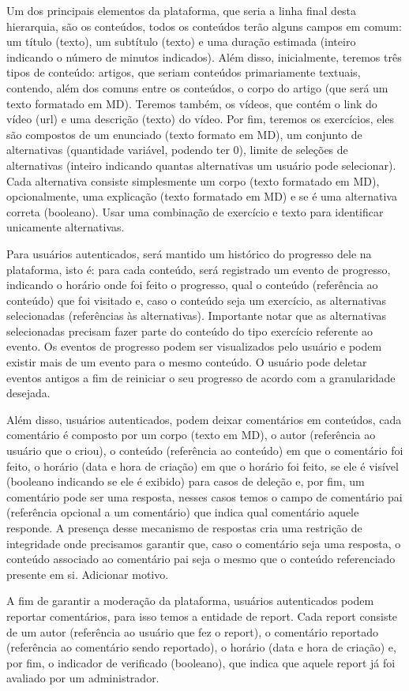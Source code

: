 Um dos principais elementos da plataforma, que seria a linha final desta
hierarquia, são os conteúdos, todos os conteúdos terão alguns campos em comum:
um título (texto), um subtítulo (texto) e uma duração estimada (inteiro
indicando o número de minutos indicados). Além disso, inicialmente, teremos
três tipos de conteúdo: artigos, que seriam conteúdos primariamente textuais,
contendo, além dos comuns entre os conteúdos, o corpo do artigo (que será um
texto formatado em MD). Teremos também, os vídeos, que contém o link do vídeo
(url) e uma descrição (texto) do vídeo. Por fim, teremos os exercícios, eles
são compostos de um enunciado (texto formato em MD), um conjunto de
alternativas (quantidade variável, podendo ter 0), limite de seleções de
alternativas (inteiro indicando quantas alternativas um usuário pode
selecionar). Cada alternativa consiste simplesmente um corpo (texto formatado
em MD), opcionalmente, uma explicação (texto formatado em MD) e se é uma
alternativa correta (booleano). Usar uma combinação de exercício e texto para
identificar unicamente alternativas.

Para usuários autenticados, será mantido um histórico do progresso dele na
plataforma, isto é: para cada conteúdo, será registrado um evento de progresso,
indicando o horário onde foi feito o progresso, qual o conteúdo (referência ao
conteúdo) que foi visitado e, caso o conteúdo seja um exercício, as
alternativas selecionadas (referências às alternativas). Importante notar que
as alternativas selecionadas precisam fazer parte do conteúdo do tipo exercício
referente ao evento. Os eventos de progresso podem ser visualizados pelo
usuário e podem existir mais de um evento para o mesmo conteúdo. O usuário pode
deletar eventos antigos a fim de reiniciar o seu progresso de acordo com a
granularidade desejada.

Além disso, usuários autenticados, podem deixar comentários em conteúdos, cada
comentário é composto por um corpo (texto em MD), o autor (referência ao
usuário que o criou), o conteúdo (referência ao conteúdo) em que o comentário
foi feito, o horário (data e hora de criação) em que o horário foi feito, se
ele é visível (booleano indicando se ele é exibido) para casos de deleção e,
por fim, um comentário pode ser uma resposta, nesses casos temos o campo de
comentário pai (referência opcional a um comentário) que indica qual comentário
aquele responde. A presença desse mecanismo de respostas cria uma restrição de
integridade onde precisamos garantir que, caso o comentário seja uma resposta,
o conteúdo associado ao comentário pai seja o mesmo que o conteúdo referenciado
presente em si. Adicionar motivo.

A fim de garantir a moderação da plataforma, usuários autenticados podem
reportar comentários, para isso temos a entidade de report. Cada report
consiste de um autor (referência ao usuário que fez o report), o comentário
reportado (referência ao comentário sendo reportado), o horário (data e hora de
criação) e, por fim, o indicador de verificado (booleano), que indica que
aquele report já foi avaliado por um administrador.
